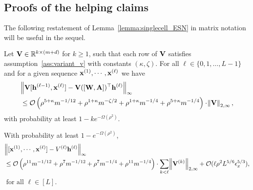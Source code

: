 \subsection{Proofs of the helping claims}
The following restatement of Lemma~\ref{lemma:singlecell_ESN} in matrix notation will be useful in the sequel. 
\begin{lemma} \label{cor:inversion_Vx}
	Let $\mathbf{V} \in \mathbb{R}^{k \times (m + d)}$ for $k \geq 1$, such that each row of $\mathbf{V}$ satisfies assumption~\ref{ass:variant_v} with constants $(\kappa, \zeta)$. For all $\ell \in \{0, 1, \ldots, L-1\}$ and for a given sequence $\mathbf{x}^{(1)}, \cdots, \mathbf{x}^{(\ell)}$ we have
	\begin{align*}
		&\norm{\mathbf{V} [\mathbf{h}^{(\ell-1)}, \mathbf{x}^{(\ell)}] - \mathbf{V} ([\mathbf{W}, \mathbf{A}])^\top \mathbf{h}^{(\ell)}}_\infty \\&\leq \mathcal{O}\left(\rho^{5 + \kappa} m^{-1/12} + \rho^{1+\kappa} m^{-\zeta/2} + \rho^{1+\kappa} m^{-1/4} + \rho^{5+\kappa} m^{-1/4}  \right) \cdot \norm{\mathbf{V}}_{2, \infty}, 
	\end{align*}
	with probability at least $1 - ke^{-\Omega(\rho^2)}$.
\end{lemma}




\begin{claim}\label{claim:Vhx_proof}
	With probability at least $1 - e^{-\Omega(\rho^2)}$,
	\begin{align*}
		&\norm{[\mathbf{x}^{(1)}, \cdots, \mathbf{x}^{(\ell)}] - V^{(\ell)} \mathbf{h}^{(\ell)}}_\infty \\&\leq \mathcal{O}\left(\rho^{11} m^{-1/12} + \rho^{7} m^{-1/12} + \rho^{7} m^{-1/4} + \rho^{11} m^{-1/4}  \right)  \cdot \sum_{k 
			< \ell} \norm{\mathbf{V}^{(k)}}_{2, \infty} + \mathcal{O}(\ell \rho^2 L^{5/6} \epsilon_x^{5/3}),  
	\end{align*}
	$\text{ for all } \ell \in [L].$
\end{claim}

